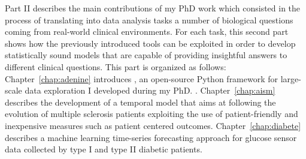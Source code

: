 Part II describes the main contributions of my PhD work which consisted in the process of translating into data analysis tasks a number of biological questions coming from real-world clinical environments. For each task, this second part shows how the previously introduced tools can be exploited in order to develop statistically sound models that are capable of providing insightful answers to different clinical questions.
This part is organized as follows:
Chapter~\ref{chap:adenine} introduces \ade, an open-source Python framework for large-scale data exploration I developed during my PhD. .
Chapter~\ref{chap:aism} describes the development of a temporal model that aims at following the evolution of multiple sclerosis patients exploiting the use of patient-friendly and inexpensive measures such as patient centered outcomes.
Chapter~\ref{chap:diabete} describes a machine learning time-series forecasting approach for glucose sensor data collected by type I and type II diabetic patients.
